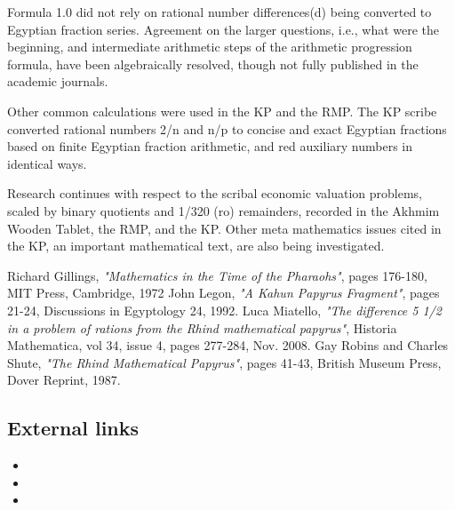 \documentclass[12pt]{article}
\begin{document}
Formula 1.0 did not rely on rational number differences(d) being converted to Egyptian fraction series. Agreement on the larger questions, i.e., what were the beginning, and intermediate arithmetic steps of the arithmetic progression formula, have been algebraically resolved, though not fully published in the academic journals. 

Other common calculations were used in the KP and the RMP. The KP scribe converted rational numbers 2/n and n/p to concise and exact Egyptian fractions based on finite Egyptian fraction arithmetic, and red auxiliary numbers in identical ways.

Research continues with respect to the scribal economic valuation problems, scaled by binary quotients and 1/320 (ro) remainders, recorded in the Akhmim Wooden Tablet, the RMP, and the KP. Other meta mathematics issues cited in the KP, an important mathematical text, are also being investigated.


\begin{thebibliography}{4}

 Richard Gillings, \emph{"Mathematics in the Time of the Pharaohs"}, pages 176-180, MIT Press, Cambridge, 1972
 John Legon, \emph{"A Kahun Papyrus Fragment"}, pages 21-24, Discussions in Egyptology 24, 1992.
 Luca Miatello, \emph{"The difference 5 1/2 in a problem of rations from the Rhind mathematical papyrus"}, Historia Mathematica, vol 34, issue 4, pages 277-284, Nov. 2008.
 Gay Robins and Charles Shute, \emph{"The Rhind Mathematical Papyrus"}, pages 41-43, British Museum Press, Dover Reprint, 1987.

\end{thebibliography}


\subsection{External links}
\begin{itemize}
\item {}
\item {}
\item {}

\end{itemize}

\end{document}
